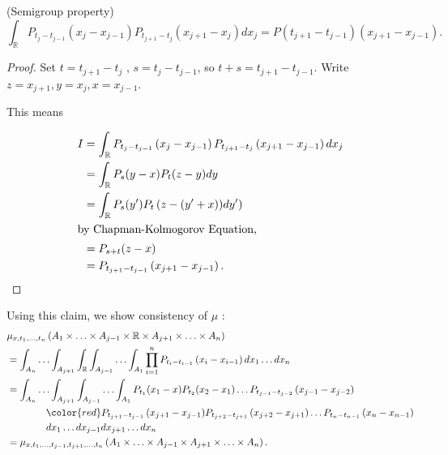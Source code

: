 
\begin{claim}
	(Semigroup property)
	\[
		\int _{\mathbb{R}} P_{t_j - t_{j-1}}(x_j - x_{j-1}) P_{t_{j+1} - t_j}\left( x_{j+1} - x_j \right) 
		d x_j = 
		P\left( t_{j+1} - t_{j-1} \right) \left( x_{j+1} - x_{j-1} \right) 
	.\] 
\end{claim}
\begin{proof}
	Set $t = t_{j+1} -t_j$ , $s = t_{j} - t_{j- 1}$, so $t + s = t_{j+1} - t_{j-1}$. Write $ z = x_{j+1}, y = x_j, x = x_{j-1}$.

	This means

	\begin{align*}
		I &= \int _{\mathbb{R}} P_{t_{j} - t_{j-1}} \left( x_j - x_{j-1} \right)  P_{t _{j+1} - t_j}\left( x_{j+1} - x_{j-1}  \right)  d x_j \\
		  &=\int _{\mathbb{R}} P_{s} (y - x) P_{t} (z - y) dy\\
		  &= \int _{\mathbb{R}} P_s(y') P_t\left( z - (y' + x)) dy' \right)  \\
		  \intertext{by Chapman-Kolmogorov Equation,}
		  &= P_{s + t} (z - x) \\
		  &= P_{t_{j+1} - t_{j-  1}} \left( x_{j+1} - x_{j-1} \right)  
	.\end{align*}
\end{proof}

Using this claim, we show consistency of $\mu$ :
\begin{align*}
	&\mu_{x, t_1, \ldots, t_n} \left( A_1 \times \ldots\times A_{j-1} \times \mathbb{R} \times A_{j+1} \times \ldots\times A_n \right) \\
	&= \int _{A_n}\ldots \int _{A_{j+1}} \int _{\mathbb{R}} \int _{A_{j-1}} \ldots \int _{A_1}
	\prod_{i=1}^{n} P_{t_i - t_{i-1}}\left( x_i - x_{i-1} \right) dx_1 \ldots dx_n \\
	&= \int _{A_n} \ldots \int _{A_{j+1}} \int _{A_{j-1}} \ldots \int _{A_1} 
P_{t_1}(x_1 - x) P_{t_2}(x_2 - x_1) \ldots P_{t_{j-1}- t_{j-2}}\left( x_{j-1} - x_{j-2} \right) \\
	& \qquad \qquad {\color{red} P_{t_{j+1} - t_{j-1}} \left( x_{j+1} - x_{j-1} \right)} P_{t_{j+2} - t_{j+1}}\left( x_{j+2} - x_{j+1} \right) \ldots P_{t_n - t_{n-1}}\left( x_n - x_{n-1} \right) \\
	& \qquad \qquad dx_1 \ldots dx_{j-1} dx_{j+1} \ldots dx_n\\
	&= \mu_{x, t_1, \ldots, t_{j-1}, t_{j+1}, \ldots, t_n} \left( A_1 \times \ldots\times A_{j-1} \times A_{j+1} \times \ldots\times A_n \right)  
.\end{align*}

